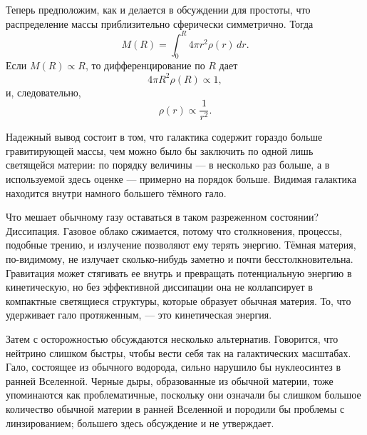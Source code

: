 Теперь предположим, как и делается в обсуждении для простоты, что распределение массы приблизительно сферически симметрично. Тогда
\begin{equation}
M(R)=\int_0^R 4\pi r^2\rho(r)\,dr.
\end{equation}
Если \(M(R)\propto R\), то дифференцирование по \(R\) дает
\begin{equation}
4\pi R^2\rho(R)\propto 1,
\end{equation}
и, следовательно,
\begin{equation}
\rho(r)\propto \frac{1}{r^2}.
\end{equation}

\begin{classroomqa}
\end{classroomqa}

Надежный вывод состоит в том, что галактика содержит гораздо больше гравитирующей массы, чем можно было бы заключить по одной лишь светящейся материи: по порядку величины — в несколько раз больше, а в используемой здесь оценке — примерно на порядок больше. Видимая галактика находится внутри намного большего тёмного гало.

Что мешает обычному газу оставаться в таком разреженном состоянии? Диссипация. Газовое облако сжимается, потому что столкновения, процессы, подобные трению, и излучение позволяют ему терять энергию. Тёмная материя, по-видимому, не излучает сколько-нибудь заметно и почти бесстолкновительна. Гравитация может стягивать ее внутрь и превращать потенциальную энергию в кинетическую, но без эффективной диссипации она не коллапсирует в компактные светящиеся структуры, которые образует обычная материя. То, что удерживает гало протяженным, — это кинетическая энергия.

Затем с осторожностью обсуждаются несколько альтернатив. Говорится, что нейтрино слишком быстры, чтобы вести себя так на галактических масштабах. Гало, состоящее из обычного водорода, сильно нарушило бы нуклеосинтез в ранней Вселенной. Черные дыры, образованные из обычной материи, тоже упоминаются как проблематичные, поскольку они означали бы слишком большое количество обычной материи в ранней Вселенной и породили бы проблемы с линзированием; большего здесь обсуждение и не утверждает.

